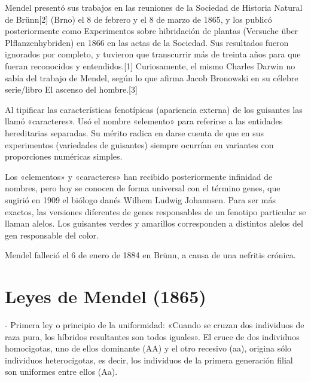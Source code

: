 \documentclass[letterpaper,12pt]{report}
\begin{document}
Mendel presentó sus trabajos en las reuniones de la Sociedad de Historia Natural de Brünn[2] (Brno) el 8 de febrero y el 8 de marzo de 1865, y los publicó posteriormente como Experimentos sobre hibridación de plantas (Versuche über Plflanzenhybriden) en 1866 en las actas de la Sociedad. Sus resultados fueron ignorados por completo, y tuvieron que transcurrir más de treinta años para que fueran reconocidos y entendidos.[1] Curiosamente, el mismo Charles Darwin no sabía del trabajo de Mendel, según lo que afirma Jacob Bronowski en su célebre serie/libro El ascenso del hombre.[3]

Al tipificar las características fenotípicas (apariencia externa) de los guisantes las llamó «caracteres». Usó el nombre «elemento» para referirse a las entidades hereditarias separadas. Su mérito radica en darse cuenta de que en sus experimentos (variedades de guisantes) siempre ocurrían en variantes con proporciones numéricas simples.

Los «elementos» y «caracteres» han recibido posteriormente infinidad de nombres, pero hoy se conocen de forma universal con el término genes, que sugirió en 1909 el biólogo danés Wilhem Ludwig Johannsen. Para ser más exactos, las versiones diferentes de genes responsables de un fenotipo particular se llaman alelos. Los guisantes verdes y amarillos corresponden a distintos alelos del gen responsable del color.

Mendel falleció el 6 de enero de 1884 en Brünn, a causa de una nefritis crónica.

\chapter{Leyes de Mendel (1865)}

\thispagestyle{empty}

- Primera ley o principio de la uniformidad: «Cuando se cruzan dos individuos de raza pura, los híbridos resultantes son todos iguales». El cruce de dos individuos homocigotas, uno de ellos dominante (AA) y el otro recesivo (aa), origina sólo individuos heterocigotas, es decir, los individuos de la primera generación filial son uniformes entre ellos (Aa).
\end{document}
